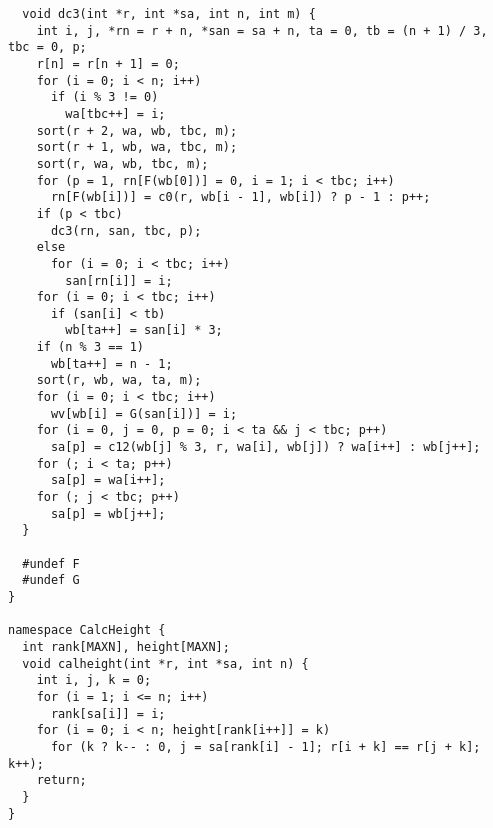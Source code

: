 \begin{lstlisting}
  void dc3(int *r, int *sa, int n, int m) {
    int i, j, *rn = r + n, *san = sa + n, ta = 0, tb = (n + 1) / 3, tbc = 0, p;
    r[n] = r[n + 1] = 0;
    for (i = 0; i < n; i++)
      if (i % 3 != 0)
        wa[tbc++] = i;
    sort(r + 2, wa, wb, tbc, m);
    sort(r + 1, wb, wa, tbc, m);
    sort(r, wa, wb, tbc, m);
    for (p = 1, rn[F(wb[0])] = 0, i = 1; i < tbc; i++)
      rn[F(wb[i])] = c0(r, wb[i - 1], wb[i]) ? p - 1 : p++;
    if (p < tbc)
      dc3(rn, san, tbc, p);
    else
      for (i = 0; i < tbc; i++)
        san[rn[i]] = i;
    for (i = 0; i < tbc; i++)
      if (san[i] < tb)
        wb[ta++] = san[i] * 3;
    if (n % 3 == 1)
      wb[ta++] = n - 1;
    sort(r, wb, wa, ta, m);
    for (i = 0; i < tbc; i++)
      wv[wb[i] = G(san[i])] = i;
    for (i = 0, j = 0, p = 0; i < ta && j < tbc; p++)
      sa[p] = c12(wb[j] % 3, r, wa[i], wb[j]) ? wa[i++] : wb[j++];
    for (; i < ta; p++)
      sa[p] = wa[i++];
    for (; j < tbc; p++)
      sa[p] = wb[j++];
  }

  #undef F
  #undef G
}

namespace CalcHeight {
  int rank[MAXN], height[MAXN];
  void calheight(int *r, int *sa, int n) {
    int i, j, k = 0;
    for (i = 1; i <= n; i++)
      rank[sa[i]] = i;
    for (i = 0; i < n; height[rank[i++]] = k)
      for (k ? k-- : 0, j = sa[rank[i] - 1]; r[i + k] == r[j + k]; k++);
    return;
  }
}

\end{lstlisting}